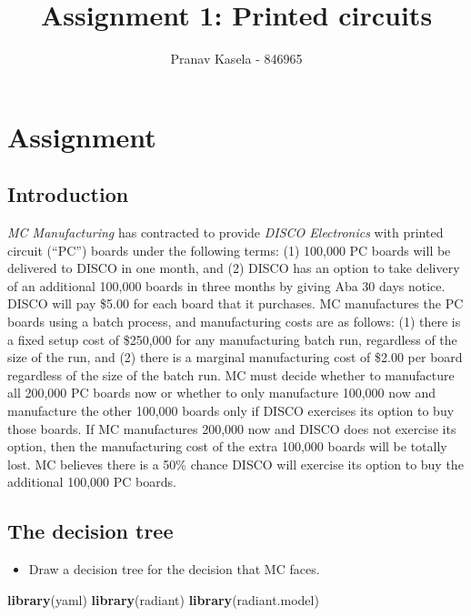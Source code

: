 \documentclass[]{article}
\title{Assignment 1: Printed circuits}
\author{Pranav Kasela - 846965}
\date{}
\newenvironment{Shaded}{\begin{snugshade}}{\end{snugshade}}
\newcommand{\KeywordTok}[1]{\textcolor[rgb]{0.13,0.29,0.53}{\textbf{#1}}}
\newcommand{\NormalTok}[1]{#1}
\providecommand{\tightlist}{%
  \setlength{\itemsep}{0pt}\setlength{\parskip}{0pt}}
\begin{document}
\maketitle

{
\setcounter{tocdepth}{5}
\tableofcontents
}
\section{Assignment}\label{assignment}

\subsection{Introduction}\label{introduction}

\emph{MC Manufacturing} has contracted to provide \emph{DISCO
Electronics} with printed circuit (``PC'') boards under the following
terms: (1) 100,000 PC boards will be delivered to DISCO in one month,
and (2) DISCO has an option to take delivery of an additional 100,000
boards in three months by giving Aba 30 days notice. DISCO will pay
\$5.00 for each board that it purchases. MC manufactures the PC boards
using a batch process, and manufacturing costs are as follows: (1) there
is a fixed setup cost of \$250,000 for any manufacturing batch run,
regardless of the size of the run, and (2) there is a marginal
manufacturing cost of \$2.00 per board regardless of the size of the
batch run. MC must decide whether to manufacture all 200,000 PC boards
now or whether to only manufacture 100,000 now and manufacture the other
100,000 boards only if DISCO exercises its option to buy those boards.
If MC manufactures 200,000 now and DISCO does not exercise its option,
then the manufacturing cost of the extra 100,000 boards will be totally
lost. MC believes there is a 50\% chance DISCO will exercise its option
to buy the additional 100,000 PC boards.

\subsection{The decision tree}\label{the-decision-tree}

\begin{itemize}
\tightlist
\item
  Draw a decision tree for the decision that MC faces.
\end{itemize}

\begin{Shaded}
\begin{Highlighting}[]
\KeywordTok{library}\NormalTok{(yaml)}
\KeywordTok{library}\NormalTok{(radiant)}
\KeywordTok{library}\NormalTok{(radiant.model)}
\end{Highlighting}
\end{Shaded}
\end{document}
